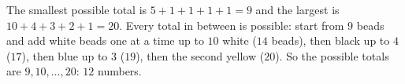 The smallest possible total is $5+1+1+1+1=9$ and the largest is $10+4+3+2+1=20$. Every total in between is possible: start from $9$ beads and add white beads one at a time up to $10$ white ($14$ beads), then black up to $4$ ($17$), then blue up to $3$ ($19$), then the second yellow ($20$). So the possible totals are $9,10,\dots,20$: $\boxed{12}$ numbers.
